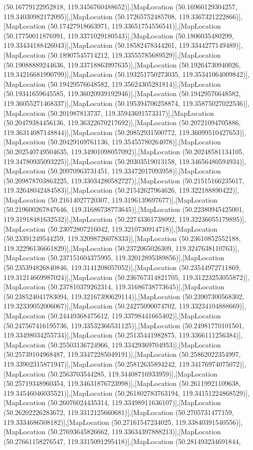(50.16779122952818, 119.3456760488652)],[MapLocation (50.16960129304257, 119.34030982172095)],[MapLocation (50.17265752485708, 119.3367321222866)],[MapLocation (50.17427918663971, 119.33651754556541)],[MapLocation (50.17750011876991, 119.3371029180543)],[MapLocation (50.1806035480299, 119.33434188426043)],[MapLocation (50.18582478344261, 119.3344277149489)],[MapLocation (50.18907545714212, 119.33555785689529)],[MapLocation (50.19088889244636, 119.33718863997635)],[MapLocation (50.19264730940026, 119.34216681990799)],[MapLocation (50.193251750273035, 119.35341064009842)],[MapLocation (50.19429576648582, 119.35624305281814)],[MapLocation (50.19341659645585, 119.36020939192946)],[MapLocation (50.19429576648582, 119.36055271468337)],[MapLocation (50.195394706258874, 119.35875027022536)],[MapLocation (50.201987813737, 119.35943691573317)],[MapLocation (50.20479384456136, 119.36322670217692)],[MapLocation (50.20721094705886, 119.36314087148844)],[MapLocation (50.20852931500772, 119.36099510427653)],[MapLocation (50.20429169761136, 119.35455780264078)],[MapLocation (50.202540749504635, 119.34901098057092)],[MapLocation (50.20248581134105, 119.34780935093225)],[MapLocation (50.20303519013158, 119.34656480594934)],[MapLocation (50.20970963731451, 119.33472017093958)],[MapLocation (50.209878703863225, 119.33034280582727)],[MapLocation (50.21515166235617, 119.32648042484583)],[MapLocation (50.21542627964626, 119.322188890422)],[MapLocation (50.21614027720307, 119.3196139697677)],[MapLocation (50.219600267847646, 119.31686738773645)],[MapLocation (50.22380945425001, 119.31918481632532)],[MapLocation (50.22743361738092, 119.32236055179895)],[MapLocation (50.23072807216042, 119.3210730914718)],[MapLocation (50.23391249544259, 119.32098726078333)],[MapLocation (50.23610852552188, 119.32296136661829)],[MapLocation (50.2372065026309, 119.3247638110763)],[MapLocation (50.237151604375995, 119.32012895389856)],[MapLocation (50.235394826840846, 119.3141208057052)],[MapLocation (50.23544972711869, 119.31214669987024)],[MapLocation (50.236767314821705, 119.31223253055872)],[MapLocation (50.237810379262314, 119.31686738773645)],[MapLocation (50.238524041783094, 119.32167390629114)],[MapLocation (50.23907300568302, 119.32339052006067)],[MapLocation (50.24275090074702, 119.33234104888669)],[MapLocation (50.24449368475612, 119.33798441665402)],[MapLocation (50.247567416195736, 119.33532366531125)],[MapLocation (50.24981770101501, 119.33498034255734)],[MapLocation (50.25135441982875, 119.3366111256384)],[MapLocation (50.25503136724966, 119.33429369704953)],[MapLocation (50.25739104968487, 119.33472285049191)],[MapLocation (50.25862022354997, 119.33902315871947)],[MapLocation (50.25812635894242, 119.34176974075072)],[MapLocation (50.2563703544285, 119.34408716933959)],[MapLocation (50.25719348960354, 119.34631876723998)],[MapLocation (50.26119921109638, 119.34546046035521)],[MapLocation (50.261802783763194, 119.34151224868529)],[MapLocation (50.26076024435314, 119.33498911636107)],[MapLocation (50.26202226283672, 119.3312125660681)],[MapLocation (50.2705731477159, 119.3334686508182)],[MapLocation (50.27161547234025, 119.33840391540556)],[MapLocation (50.27693645826662, 119.33634397888213)],[MapLocation (50.27661158276547, 119.3315091295418)],[MapLocation (50.281493234691844, 